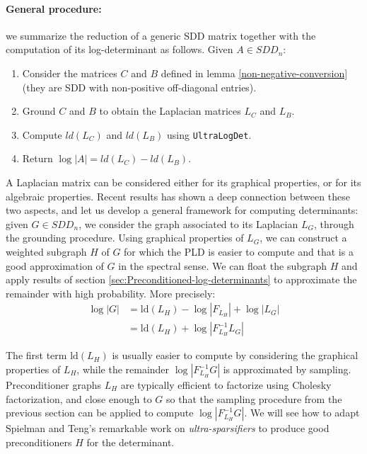 \paragraph{General procedure:} we summarize the reduction of a generic SDD matrix together with the computation of its log-determinant as follows. Given $A \in SDD_n$:
\begin{enumerate}
\item Consider the matrices $C$ and $B$ defined in lemma \ref{non-negative-conversion} (they are SDD with non-positive off-diagonal entries). 
\item Ground $C$ and $B$ to obtain the Laplacian matrices $L_C$ and $L_B$.
\item Compute $ld(L_C)$ and $ld(L_B)$ using \texttt{UltraLogDet}.
\item Return $\log |A| = ld(L_C) - ld(L_B)$.   
\end{enumerate}  


A Laplacian matrix can be considered either for its graphical properties,
or for its algebraic properties. Recent results has shown a deep connection
between these two aspects, and let us develop a general framework
for computing determinants: given $G\in SDD_{n}$, we consider the
graph associated to its Laplacian $L_{G}$, through the grounding
procedure. Using graphical properties of $L_{G}$, we can construct
a weighted subgraph $H$ of $G$ for which the PLD is easier
to compute and that is a good approximation of $G$ in the spectral
sense. We can float the subgraph $H$ and apply results of section
\ref{sec:Preconditioned-log-determinants} to approximate the remainder
with high probability. More precisely: 
\begin{align*}
\log\left|G\right| & =\text{ld}\left(L_{H}\right)-\log\left|F_{L_{H}}\right|+\log\left|L_G\right|\\
 & =\text{ld}\left(L_{H}\right)+\log\left|F_{L_{H}}^{-1}L_G\right|
\end{align*}


The first term $\text{ld}\left(L_{H}\right)$ is usually easier to
compute by considering the graphical properties of $L_{H}$, while
the remainder $\log\left|F_{L_{H}}^{-1}G\right|$ is approximated
by sampling. Preconditioner graphs $L_{H}$ are typically efficient
to factorize using Cholesky factorization, and close enough to $G$
so that the sampling procedure from the previous section can be applied
to compute $\log\left|F_{L_{H}}^{-1}G\right|$. We will see how to
adapt Spielman and Teng's remarkable work on \emph{ultra-sparsifiers}
to produce good preconditioners $H$ for the determinant. 


